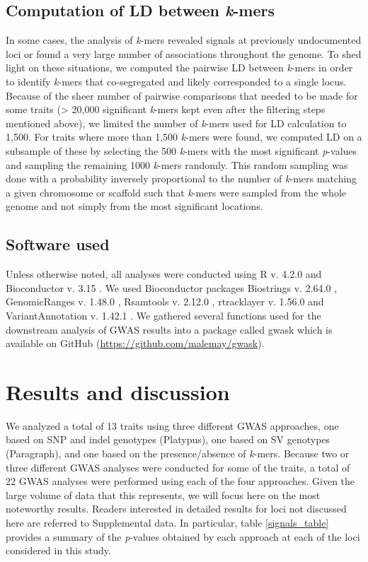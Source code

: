 \subsection*{Computation of LD between \emph{k}-mers}
\label{sv-gwas-ld-kmers}

In some cases, the analysis of \emph{k}-mers revealed signals at previously
undocumented loci or found a very large number of associations throughout the
genome. To shed light on these situations, we computed the pairwise LD between
\emph{k}-mers in order to identify \emph{k}-mers that co-segregated and
likely corresponded to a single locus. Because of the sheer number of pairwise
comparisons that needed to be made for some traits (> 20,000 significant
\emph{k}-mers kept even after the filtering steps mentioned above), we limited
the number of \emph{k}-mers used for LD calculation to 1,500. For traits where
more than 1,500 \emph{k}-mers were found, we computed LD on a subsample of
these by selecting the 500 \emph{k}-mers with the most significant
\emph{p}-values and sampling the remaining 1000 \emph{k}-mers randomly. This
random sampling was done with a probability inversely proportional to the
number of \emph{k}-mers matching a given chromosome or scaffold such that
\emph{k}-mers were sampled from the whole genome and not simply from the most
significant locations.

\subsection*{Software used}
\label{sv-gwas-software-used}

Unless otherwise noted, all analyses were conducted using R v. 4.2.0
\citep{r2022} and Bioconductor v. 3.15 \citep{huber2015}. We used Bioconductor
packages Biostrings v. 2.64.0 \citep{pages2022}, GenomicRanges v. 1.48.0
\citep{lawrence2013}, Rsamtools v. 2.12.0 \citep{rsamtools2022}, rtracklayer v.
1.56.0 \citep{lawrence2009} and VariantAnnotation v. 1.42.1
\citep{obenchain2014}.  We gathered several functions used for the downstream
analysis of GWAS results into a package called gwask which is available on
GitHub (\url{https://github.com/malemay/gwask}).

\section*{Results and discussion}
\label{sv-gwas-results-discussion}

We analyzed a total of 13 traits using three different GWAS approaches, one
based on SNP and indel genotypes (Platypus), one based on SV genotypes (Paragraph),
and one based on the presence/absence of \textit{k}-mers.
Because two or three different GWAS analyses were conducted for some of the traits, a
total of 22 GWAS analyses were performed using each of the four approaches.
Given the large volume of data that this represents, we will focus here on the
most noteworthy results. Readers interested in detailed results for loci not
discussed here are referred to Supplemental data. In particular, table \ref{signals_table}
provides a summary of the \textit{p}-values obtained by each approach at each
of the loci considered in this study.

